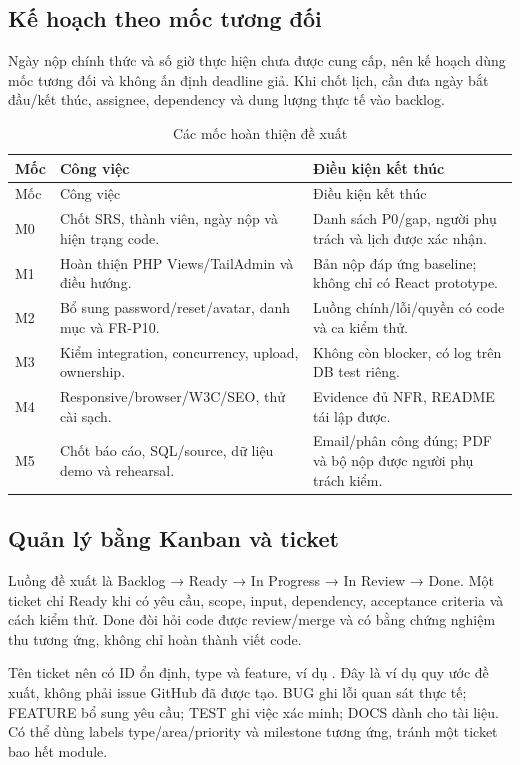 \subsection{Kế hoạch theo mốc tương đối}
Ngày nộp chính thức và số giờ thực hiện chưa được cung cấp, nên kế hoạch dùng mốc tương đối và không ấn định deadline giả. Khi chốt lịch, cần đưa ngày bắt đầu/kết thúc, assignee, dependency và dung lượng thực tế vào backlog.
{\small
\begin{longtable}{@{}P{1.3cm}P{6.5cm}P{6.7cm}@{}}
\caption{Các mốc hoàn thiện đề xuất}\label{tab:milestones}\\
\toprule Mốc & Công việc & Điều kiện kết thúc\\\midrule\endfirsthead
\toprule Mốc & Công việc & Điều kiện kết thúc\\\midrule\endhead
M0 & Chốt SRS, thành viên, ngày nộp và hiện trạng code. & Danh sách P0/gap, người phụ trách và lịch được xác nhận.\\
M1 & Hoàn thiện PHP Views/TailAdmin và điều hướng. & Bản nộp đáp ứng baseline; không chỉ có React prototype.\\
M2 & Bổ sung password/reset/avatar, danh mục và FR-P10. & Luồng chính/lỗi/quyền có code và ca kiểm thử.\\
M3 & Kiểm integration, concurrency, upload, ownership. & Không còn blocker, có log trên DB test riêng.\\
M4 & Responsive/browser/W3C/SEO, thử cài sạch. & Evidence đủ NFR, README tái lập được.\\
M5 & Chốt báo cáo, SQL/source, dữ liệu demo và rehearsal. & Email/phân công đúng; PDF và bộ nộp được người phụ trách kiểm.\\
\bottomrule\end{longtable}}

\subsection{Quản lý bằng Kanban và ticket}
Luồng đề xuất là Backlog → Ready → In Progress → In Review → Done. Một ticket chỉ Ready khi có yêu cầu, scope, input, dependency, acceptance criteria và cách kiểm thử. Done đòi hỏi code được review/merge và có bằng chứng nghiệm thu tương ứng, không chỉ hoàn thành viết code.

Tên ticket nên có ID ổn định, type và feature, ví dụ . Đây là ví dụ quy ước đề xuất, không phải issue GitHub đã được tạo. BUG ghi lỗi quan sát thực tế; FEATURE bổ sung yêu cầu; TEST ghi việc xác minh; DOCS dành cho tài liệu. Có thể dùng labels type/area/priority và milestone tương ứng, tránh một ticket bao hết module.

